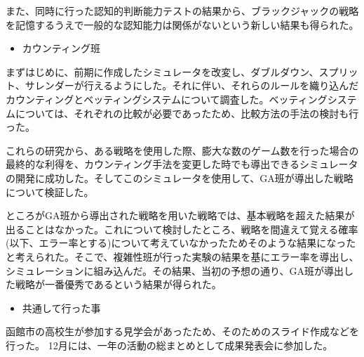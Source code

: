 また、同時に行った認知的判断能力テストの結果から、ブラックジャックの戦略を記憶するうえで一般的な認知能力は関係がないという新しい結果も得られた。

\begin{itemize}
\item カウンティング班
\end{itemize}

まずはじめに、前期に作成したシミュレータを改変し、ダブルダウン、スプリット、サレンダーが行えるようにした。それに伴い、それらのルールを織り込んだカウンティングとベッティングシステムについて調査した。ベッティングシステムについては、それぞれの比較が必要であったため、比較方法の手法の検討も行った。

これらの研究から、ある戦略を使用した際、膨大な数のゲーム数を行った場合の最終的な利得を、カウンティング手法を変更した時でも導出できるシミュレータの開発に成功した。そしてこのシミュレータを使用して、GA班が導出した戦略について検証した。

ところがGA班から導出された戦略を用いた戦略では、基本戦略を超えた結果が出ることはなかった。これについて検討したところ、戦略を間違えて覚える確率(以下、エラー率とする)について考えていなかったためそのような結果になったと考えられた。そこで、複雑性班が行った実験の結果を基にエラー率を導出し、シミュレーションに組み込んだ。その結果、当初の予想の通り、GA班が導出した戦略が一番優秀であるという結果が得られた。

\begin{itemize}
\item 共通して行った事
\end{itemize}

函館市の高校生が参加する見学会があったため、そのためのスライド作成などを行った。
12月には、一年の活動の総まとめとして成果発表会に参加した。

